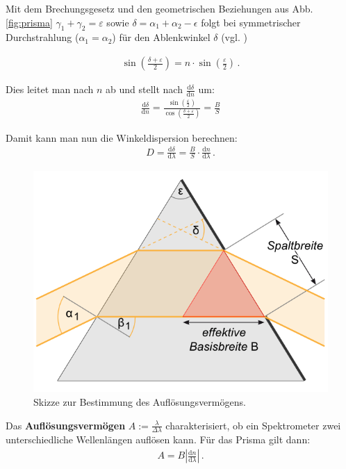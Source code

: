 \documentclass[12pt,a4paper,titlepage,headinclude,bibtotoc]{scrartcl}
\newcommand{\dif}{\ensuremath{\mathrm{d}}}
\begin{document}
Mit dem Brechungsgesetz  und den geometrischen Beziehungen aus Abb.\ref{fig:prisma} $\gamma_1+\gamma_2=\varepsilon$ sowie $\delta=\alpha_1+\alpha_2-\epsilon$ folgt bei symmetrischer Durchstrahlung ($\alpha_1=\alpha_2$) für den Ablenkwinkel $\delta$ (vgl. \cite[S.187f.]{hecht})

\begin{align}
	\sin\left(\frac{\delta+\varepsilon}{2}\right)=n\cdot\sin\left(\frac{\varepsilon}{2}\right)\,.
\end{align}

Dies leitet man nach $n$ ab und stellt nach $\frac{\dif \delta}{\dif n}$ um:
\begin{align}
	\frac{\dif \delta}{\dif n}=\frac{\sin\left(\frac{\varepsilon}{2}\right)}{\cos\left(\frac{\delta+\varepsilon}{2}\right)}=\frac{B}{S}
\end{align}

Damit kann man nun die Winkeldispersion berechnen:
\begin{align}
	D=\frac{\dif \delta}{\dif \lambda}=\frac{B}{S}\cdot\frac{\dif n}{\dif \lambda}\,.
	\label{eq:winkeldispersion}
\end{align}

\begin{figure}[!h]
	\centering
	\includegraphics[scale=0.6]{Prisma2.png}
	\caption{Skizze zur Bestimmung des Auflösungsvermögens. \cite[Datum: 28.12.2014]{LP19}}
	\label{fig:prisma2}
\end{figure}

Das \textbf{Auflösungsvermögen} $A:=\frac{\lambda}{\Delta\lambda}$ charakterisiert, ob ein Spektrometer zwei unterschiedliche Wellenlängen auflösen kann.
Für das Prisma gilt dann:
\begin{align}
	A=B\left|\frac{\dif n}{\dif \lambda}\right|\,.
	\label{eq:aufloesungP}
\end{align}
\end{document}

